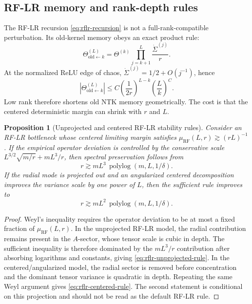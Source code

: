 \documentclass{article}
\newtheorem{proposition}[theorem]{Proposition}
\begin{document}
\subsection{RF-LR memory and rank-depth rules}
The RF-LR recursion \eqref{eq:rflr-recursion} is not a full-rank-compatible perturbation. Its old-kernel memory obeys an exact product rule:
\begin{equation}
\Theta^{(L)}_{\mathrm{old}\leftarrow k}
=\Theta^{(k)}\prod_{j=k+1}^{L}\frac{\dot\Sigma^{(j)}}{r}.
\label{eq:rflr-memory-product}
\end{equation}
At the normalized ReLU edge of chaos, \(\dot\Sigma^{(j)}=1/2+O(j^{-1})\), hence
\begin{equation}
\left|\Theta^{(L)}_{\mathrm{old}\leftarrow k}\right|
\le C\left(\frac1{2r}\right)^{L-k}\left(\frac{L}{k}\right)^C.
\label{eq:rflr-memory-bound}
\end{equation}
Low rank therefore shortens old NTK memory geometrically. The cost is that the centered deterministic margin can shrink with \(r\) and \(L\).

\begin{proposition}[Unprojected and centered RF-LR stability rules]
\label{prop:rflr-rules}
Consider an RF-LR bottleneck whose centered limiting margin satisfies
\(\mu_{\mathrm{RF}}(L,r)\gtrsim (rL)^{-1}\). If the empirical operator deviation is controlled by the conservative scale \(L^{3/2}\sqrt{m/r}+mL^3/r\), then spectral preservation follows from
\begin{equation}
r\gtrsim mL^3\,\operatorname{polylog}(m,L,1/\delta).
\label{eq:rflr-unprojected-rule}
\end{equation}
If the radial mode is projected out and an angularized centered decomposition improves the variance scale by one power of \(L\), then the sufficient rule improves to
\begin{equation}
r\gtrsim mL^2\,\operatorname{polylog}(m,L,1/\delta).
\label{eq:rflr-centered-rule}
\end{equation}
\end{proposition}

\begin{proof}
Weyl's inequality requires the operator deviation to be at most a fixed fraction of \(\mu_{\mathrm{RF}}(L,r)\). In the unprojected RF-LR model, the radial contribution remains present in the \(A\)-sector, whose tensor scale is cubic in depth. The sufficient inequality is therefore dominated by the \(mL^3/r\) contribution after absorbing logarithms and constants, giving \eqref{eq:rflr-unprojected-rule}. In the centered/angularized model, the radial sector is removed before concentration and the dominant tensor variance is quadratic in depth. Repeating the same Weyl argument gives \eqref{eq:rflr-centered-rule}. The second statement is conditional on this projection and should not be read as the default RF-LR rule.
\end{proof}
\end{document}
